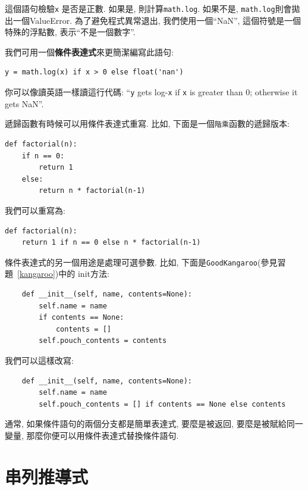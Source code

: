 \documentclass[10pt]{book}
\begin{document}
這個語句檢驗{\tt x} 是否是正數. 
如果是, 則計算{\tt math.log}. 
如果不是, {\tt math.log}則會拋出一個ValueError.
為了避免程式異常退出, 我們使用一個``NaN'', 這個符號是一個特殊的浮點數, 
表示``不是一個數字''. 

我們可用一個{\bf 條件表達式}來更簡潔編寫此語句:

\begin{verbatim}
y = math.log(x) if x > 0 else float('nan')
\end{verbatim}

你可以像讀英語一樣讀這行代碼: ``{\tt y} gets log-{\tt x}
if {\tt x} is greater than 0; otherwise it gets NaN''.

遞歸函數有時候可以用條件表達式重寫. 
比如, 下面是一個{\tt 階乘}函數的遞歸版本:

\begin{verbatim}
def factorial(n):
    if n == 0:
        return 1
    else:
        return n * factorial(n-1)
\end{verbatim}

我們可以重寫為:

\begin{verbatim}
def factorial(n):
    return 1 if n == 0 else n * factorial(n-1)
\end{verbatim}

條件表達式的另一個用途是處理可選參數. 
比如, 下面是{\tt GoodKangaroo}(參見習題~\ref{kangaroo})中的
init方法:

\begin{verbatim}
    def __init__(self, name, contents=None):
        self.name = name
        if contents == None:
            contents = []
        self.pouch_contents = contents
\end{verbatim}

我們可以這樣改寫:

\begin{verbatim}
    def __init__(self, name, contents=None):
        self.name = name
        self.pouch_contents = [] if contents == None else contents 
\end{verbatim}

通常, 如果條件語句的兩個分支都是簡單表達式, 要麼是被返回, 要麼是被賦給同一變量, 
那麼你便可以用條件表達式替換條件語句. 



\section{串列推導式}
\end{document}
